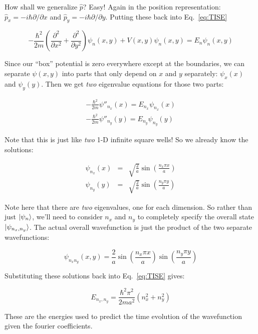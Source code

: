 \documentclass[11pt]{article} %
\begin{document}
How shall we generalize $\hat{p}$? Easy! Again in the position representation: $\hat{p}_x = -i\hbar \partial/\partial x$ and $\hat{p}_y = -i\hbar \partial/\partial y$. Putting these back into Eq.~\ref{eq:TISE}

\begin{equation}
-\frac{\hbar^2}{2m}(\frac{\partial^2}{\partial x^2} + \frac{\partial^2}{\partial y^2})\psi_n(x,y) + V(x,y)\psi_n(x,y) = E_n \psi_n(x,y)
\label{eq:TISE-detail}
\end{equation}

Since our ``box'' potential is zero everywhere except at the  boundaries, we can separate $\psi(x,y)$ into parts that only depend on $x$ and $y$ separately: $\psi_x(x)$ and $\psi_y(y)$. Then we get {\it two} eigenvalue equations for those two parts:

\begin{eqnarray}
-\frac{\hbar^2}{2m}\psi''_{n_x}(x) = E_{n_x} \psi_{n_x}(x)\\
-\frac{\hbar^2}{2m}\psi''_{n_y}(y) = E_{n_y} \psi_{n_y}(y)
\end{eqnarray}

Note that this is just like {\it two} 1-D infinite square wells! So we already know the solutions:

\begin{eqnarray}
\psi_{n_x}(x) & = & \sqrt{\frac{2}{a}}\sin(\frac{n_x\pi x}{a})\\
\psi_{n_y}(y) & = & \sqrt{\frac{2}{a}}\sin(\frac{n_y\pi y}{a})
\end{eqnarray}

Note here that there are {\it two} eigenvalues, one for each dimension. So rather than just $\ket{\psi_n}$, we'll need to consider $n_x$ and $n_y$ to completely specify the overall state $\ket{\psi_{n_x,n_y}}$. The actual overall wavefunction is just the product of the two separate wavefunctions:

\begin{equation}
\psi_{n_xn_y}(x,y) = \frac{2}{a}\sin(\frac{n_x\pi x}{a})\sin(\frac{n_y\pi y}{a})
\label{eq:Solution-swe}
\end{equation}

Substituting these solutions back into Eq.~\ref{eq:TISE} gives:

\begin{equation}
E_{n_x,n_y} = \frac{\hbar^2 \pi^2}{2ma^2}(n_x^2 + n_y^2)
\end{equation}

These are the energies used to predict the time evolution of the wavefunction given the fourier coefficients.
\end{document}
